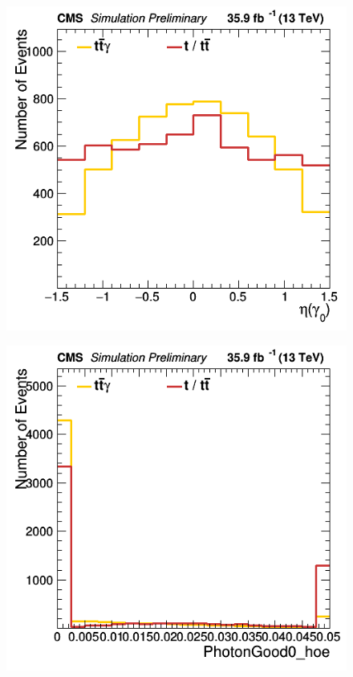 \documentclass[11pt]{scrartcl}
\begin{document}
	\begin{figure}[H]
	\centering
	\begin{minipage}{.5\textwidth}
	  \centering
	  \includegraphics[width=0.75\linewidth]{figures/Select3/PhotonGood0_eta.png}
	  \label{fig:PhotonGood0eta}
	\end{minipage}%
	\begin{minipage}{.5\textwidth}
	  \centering
	  \includegraphics[width=0.75\linewidth]{figures/Select3/PhotonGood0_hoe.png}
	  \label{fig:PhotonGood0hoe}
	\end{minipage}
	\end{figure}
	
\end{document}
